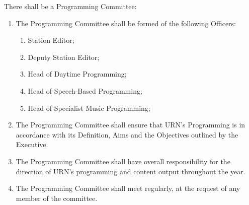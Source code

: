 \item There shall be a Programming Committee:
\begin{enumerate}[label*=\arabic*.]
    \item The Programming Committee shall be formed of the following Officers:
          \begin{enumerate}[label*=\arabic*.]
              \item Station Editor;
              \item Deputy Station Editor;
              \item Head of Daytime Programming;
              \item Head of Speech-Based Programming;
              \item Head of Specialist Music Programming;
          \end{enumerate}
    \item The Programming Committee shall ensure that URN's Programming is in accordance with its Definition, Aims and the Objectives outlined by the Executive.
    \item The Programming Committee shall have overall responsibility for the direction of URN's programming and content output throughout the year.
    \item The Programming Committee shall meet regularly, at the request of any member of the committee.
\end{enumerate}
